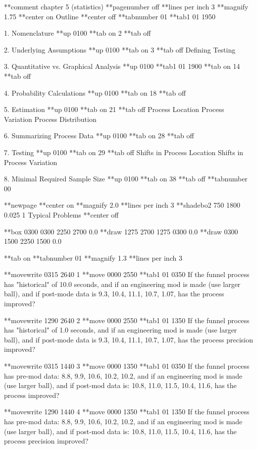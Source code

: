 **comment chapter 5 (statistics)
**pagenumber off
**lines per inch 3
**magnify 1.75
**center on
Outline
**center off
**tabnumber 01
**tab1 01 1950
 
 
1. Nomenclature
**up 0100
**tab on
2
**tab off
 
2. Underlying Assumptions
**up 0100
**tab on
3
**tab off
      Defining
      Testing
 
3. Quantitative vs. Graphical Analysis
**up 0100
**tab1 01 1900
**tab on
14
**tab off
 
4. Probability Calculations
**up 0100
**tab on
18
**tab off
 
5. Estimation
**up 0100
**tab on
21
**tab off
      Process Location
      Process Variation
      Process Distribution
 
6. Summarizing Process Data
**up 0100
**tab on
28
**tab off
 
7. Testing
**up 0100
**tab on
29
**tab off
      Shifts in Process Location
      Shifts in Process Variation
 
8. Minimal Required Sample Size
**up 0100
**tab on
38
**tab off
**tabnumber 00
 
**newpage
**center on
**magnify 2.0
**lines per inch 3
**shadebo2 750 1800 0.025 1
Typical Problems
**center off
 
**box 0300 0300 2250 2700 0.0
**draw 1275 2700 1275 0300 0.0
**draw 0300 1500 2250 1500 0.0
 
**tab on
**tabnumber 01
**magnify 1.3
**lines per inch 3
 
**movewrite 0315 2640 1
**move 0000 2550
**tab1 01 0350
If the funnel process has
"historical"       of 10.0 seconds,
and if an engineering mod
is made (use larger ball),
and if post-mode data is
   9.3, 10.4, 11.1, 10.7, 1.07,
has the process improved?
 
**movewrite 1290 2640 2
**move 0000 2550
**tab1 01 1350
If the funnel process has
"historical"       of 1.0 seconds,
and if an engineering mod
is made (use larger ball),
and if post-mode data is
   9.3, 10.4, 11.1, 10.7, 1.07,
has the process precision
improved?
 
**movewrite 0315 1440 3
**move 0000 1350
**tab1 01 0350
If the funnel process has
pre-mod data:
   8.8, 9.9, 10.6, 10.2, 10.2,
and if an engineering mod
is made (use larger ball),
and if post-mod data is:
   10.8, 11.0, 11.5, 10.4, 11.6,
has the process improved?
 
**movewrite 1290 1440 4
**move 0000 1350
**tab1 01 1350
If the funnel process has
pre-mod data:
   8.8, 9.9, 10.6, 10.2, 10.2,
and if an engineering mod
is made (use larger ball),
and if post-mod data is:
   10.8, 11.0, 11.5, 10.4, 11.6,
has the process precision
improved?
 
